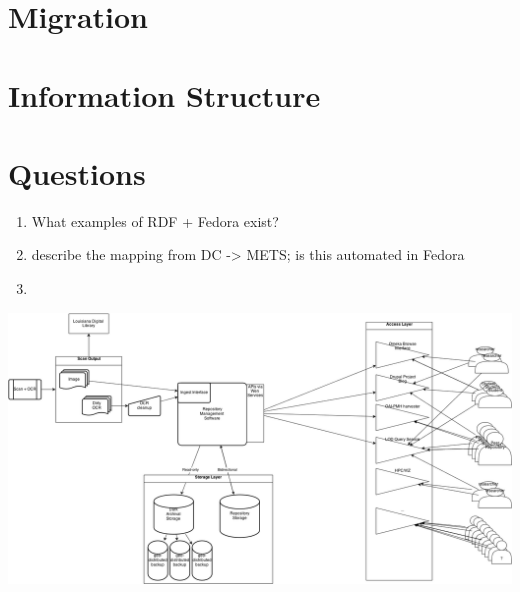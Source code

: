 \documentclass[oneside]{article}
\begin{document}
\section{Migration}


\section{Information Structure}


\section{Questions}
\begin{enumerate}
  \item{What examples of RDF + Fedora exist?}
  \item{describe the mapping from DC -> METS; is this automated in Fedora}
  \item{}
\end{enumerate}

\includegraphics[width=\textwidth]{apc-01.png}



\end{document}
